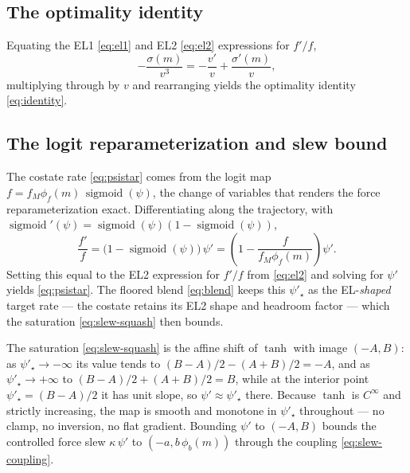 \documentclass[11pt]{article}
\DeclareMathOperator{\sigmoid}{sigmoid}
\begin{document}
\subsection{The optimality identity}\label{app:identity}

Equating the EL1 \eqref{eq:el1} and EL2 \eqref{eq:el2} expressions for $f'/f$,
\[
- \frac{\sigma(m)}{v^3} = - \frac{v'}{v} + \frac{\sigma'(m)}{v},
\]
multiplying through by $v$ and rearranging yields the optimality identity \eqref{eq:identity}.

\subsection{The logit reparameterization and slew bound}\label{app:logit}

The costate rate \eqref{eq:psistar} comes from the logit map $f = f_M \phi_f(m)\,\sigmoid(\psi)$, the change of variables that renders the force reparameterization exact. Differentiating along the trajectory, with $\sigmoid'(\psi) = \sigmoid(\psi)(1 - \sigmoid(\psi))$,
\[
\frac{f'}{f} = \bigl(1 - \sigmoid(\psi)\bigr)\, \psi' = \left(1 - \frac{f}{f_M \phi_f(m)}\right)\psi'.
\]
Setting this equal to the EL2 expression for $f'/f$ from \eqref{eq:el2} and solving for $\psi'$ yields \eqref{eq:psistar}. The floored blend \eqref{eq:blend} keeps this $\psi'_\star$ as the EL-\emph{shaped} target rate --- the costate retains its EL2 shape and headroom factor --- which the saturation \eqref{eq:slew-squash} then bounds.

The saturation \eqref{eq:slew-squash} is the affine shift of $\tanh$ with image $(-A, B)$: as $\psi'_\star \to -\infty$ its value tends to $(B-A)/2 - (A+B)/2 = -A$, and as $\psi'_\star \to +\infty$ to $(B-A)/2 + (A+B)/2 = B$, while at the interior point $\psi'_\star = (B-A)/2$ it has unit slope, so $\psi' \approx \psi'_\star$ there. Because $\tanh$ is $C^\infty$ and strictly increasing, the map is smooth and monotone in $\psi'_\star$ throughout --- no clamp, no inversion, no flat gradient. Bounding $\psi'$ to $(-A, B)$ bounds the controlled force slew $\kappa\,\psi'$ to $(-a, b\,\phi_b(m))$ through the coupling \eqref{eq:slew-coupling}.
\end{document}
